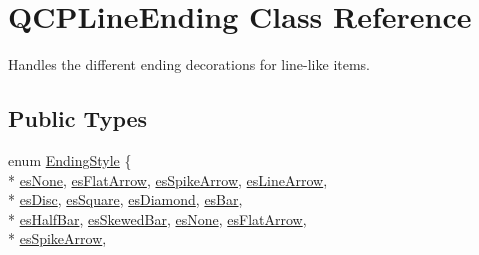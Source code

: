\hypertarget{class_q_c_p_line_ending}{}\section{Q\+C\+P\+Line\+Ending Class Reference}
\label{class_q_c_p_line_ending}


Handles the different ending decorations for line-\/like items.  


\subsection*{Public Types}
\begin{DoxyCompactItemize}
\item 
enum \hyperlink{class_q_c_p_line_ending_a5ef16e6876b4b74959c7261d8d4c2cd5}{Ending\+Style} \{ \\*
\hyperlink{class_q_c_p_line_ending_a5ef16e6876b4b74959c7261d8d4c2cd5a4bb04638a925da992ec85609a014806e}{es\+None}, 
\hyperlink{class_q_c_p_line_ending_a5ef16e6876b4b74959c7261d8d4c2cd5ab029cfae46581afc53bb2a993450fe67}{es\+Flat\+Arrow}, 
\hyperlink{class_q_c_p_line_ending_a5ef16e6876b4b74959c7261d8d4c2cd5a814748a589d8bf2a0b6bf8ed4a6a5376}{es\+Spike\+Arrow}, 
\hyperlink{class_q_c_p_line_ending_a5ef16e6876b4b74959c7261d8d4c2cd5a74728a4c390e3756807c3537de728ff5}{es\+Line\+Arrow}, 
\\*
\hyperlink{class_q_c_p_line_ending_a5ef16e6876b4b74959c7261d8d4c2cd5a4e7a48003d59b1eed00767e879440600}{es\+Disc}, 
\hyperlink{class_q_c_p_line_ending_a5ef16e6876b4b74959c7261d8d4c2cd5a8b0298e645008220cbc6cef9d05eb950}{es\+Square}, 
\hyperlink{class_q_c_p_line_ending_a5ef16e6876b4b74959c7261d8d4c2cd5a0a9e21dfaf144c9b8ae41711f61199e3}{es\+Diamond}, 
\hyperlink{class_q_c_p_line_ending_a5ef16e6876b4b74959c7261d8d4c2cd5a1683a6a39898f53737ee21d4fedba791}{es\+Bar}, 
\\*
\hyperlink{class_q_c_p_line_ending_a5ef16e6876b4b74959c7261d8d4c2cd5a7b0b7402cc4bb17848d2a533a20c1e6f}{es\+Half\+Bar}, 
\hyperlink{class_q_c_p_line_ending_a5ef16e6876b4b74959c7261d8d4c2cd5a2d5490a55ff209f2443501a7f5328aab}{es\+Skewed\+Bar}, 
\hyperlink{class_q_c_p_line_ending_a5ef16e6876b4b74959c7261d8d4c2cd5a4bb04638a925da992ec85609a014806e}{es\+None}, 
\hyperlink{class_q_c_p_line_ending_a5ef16e6876b4b74959c7261d8d4c2cd5ab029cfae46581afc53bb2a993450fe67}{es\+Flat\+Arrow}, 
\\*
\hyperlink{class_q_c_p_line_ending_a5ef16e6876b4b74959c7261d8d4c2cd5a814748a589d8bf2a0b6bf8ed4a6a5376}{es\+Spike\+Arrow}, 

\end{DoxyCompactItemize}
